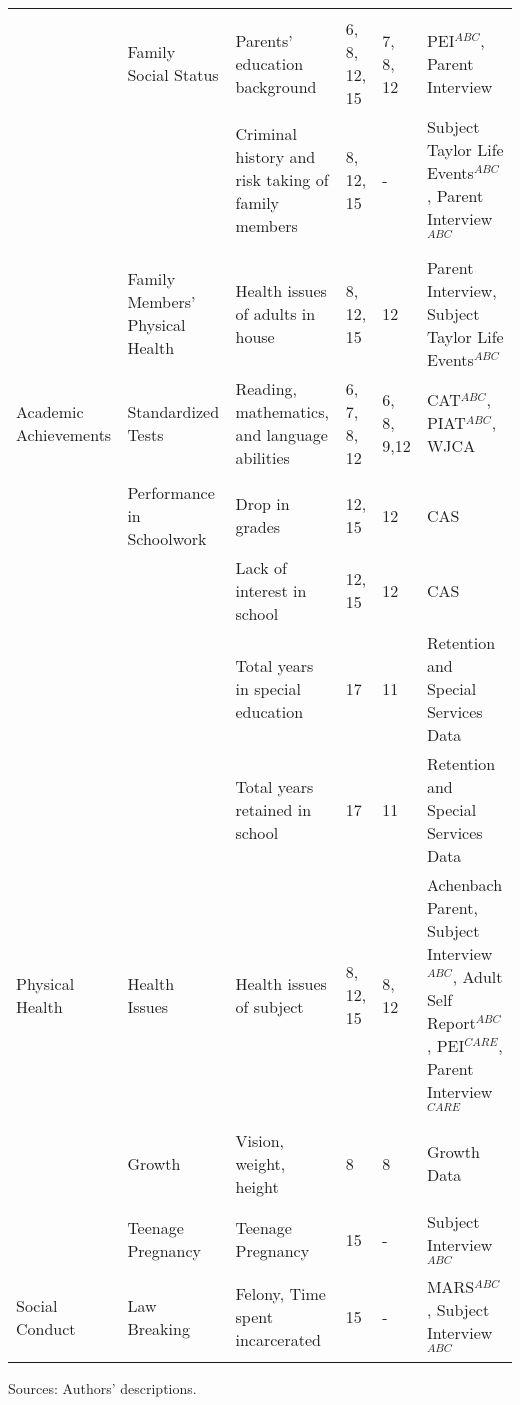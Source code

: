 \begin{sidewaystable}[H]
\begin{threeparttable}
\begin{tabular}{L{3.5cm} C{3.5cm} C{5cm} C{1.5cm} C{1.5cm} C{6cm}}
	&	\\
	&	Family Social Status	&	Parents' education background	&	6, 8, 12, 15	&	7, 8, 12	&	PEI$^{ABC}$, Parent Interview	\\
	&		&	Criminal history and risk taking of family members	&	8, 12, 15	&	- 	&	Subject Taylor Life Events$^{ABC}$, Parent Interview$^{ABC}$	\\
	&	\\
	&	Family Members' Physical Health	&	Health issues of adults in house	&	8, 12, 15	&	12	&	Parent Interview, Subject Taylor Life Events$^{ABC}$	\\ 	\midrule
Academic Achievements	&	Standardized Tests	&	Reading, mathematics, and language abilities	&	6, 7, 8, 12	&	6, 8, 9,12	&	CAT$^{ABC}$, PIAT$^{ABC}$, WJCA	\\
		&	\\
	&	Performance in Schoolwork	&	Drop in grades	&	12, 15		&	12	&	CAS	\\
	&		&	Lack of interest in school	&	12, 15		&	12	&	CAS	\\
	&		&  Total years in special education & 17 & 11 & Retention and Special Services Data \\
	&		&  Total years retained in school & 17 & 11 & Retention and Special Services Data \\  \midrule
Physical Health	&	Health Issues	&	Health issues of subject	&	8, 12, 15	&	8, 12	&	Achenbach Parent, Subject Interview$^{ABC}$, Adult Self Report$^{ABC}$, PEI$^{CARE}$, Parent Interview$^{CARE}$	\\
	&	\\
	&	Growth	&	Vision, weight, height	&	8	&	8	&	Growth Data	\\
	&	\\
	&	Teenage Pregnancy	&	Teenage Pregnancy	&	15	&	- 	& Subject Interview$^{ABC}$		\\ \midrule
Social Conduct	&	Law Breaking	&	Felony, Time spent incarcerated	&	15	&	- 	&	MARS$^{ABC}$, Subject Interview$^{ABC}$	\\ \bottomrule
\end{tabular}
\begin{tablenotes}
\scriptsize
\item Sources: Authors' descriptions. \\

\end{tablenotes}
\end{threeparttable}
\end{sidewaystable}
